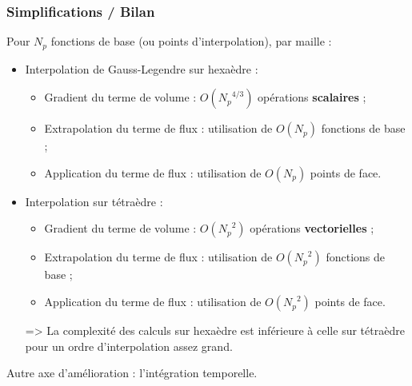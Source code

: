 \begin{frame}
\frametitle{Simplifications / Bilan}
\vfill
Pour $N_p$ fonctions de base (ou points d'interpolation), par maille :
\vfill
\begin{itemize}
\item Interpolation de Gauss-Legendre sur hexaèdre :
\begin{itemize}
\item Gradient du terme de volume : $O({N_p}^{4/3})$ opérations \textbf{scalaires} ;
\item Extrapolation du terme de flux : utilisation de $O(N_p)$ fonctions de base ;
\item Application du terme de flux : utilisation de $O(N_p)$ points de face.
\end{itemize}
\vfill
\item Interpolation sur tétraèdre :
\begin{itemize}
\item Gradient du terme de volume : $O({N_p}^{2})$ opérations \textbf{vectorielles} ;
\item Extrapolation du terme de flux : utilisation de $O({N_p}^{2})$ fonctions de base ;
\item Application du terme de flux : utilisation de $O({N_p}^{2})$ points de face.
\end{itemize}
\vfill
\item [=>] La complexité des calculs sur hexaèdre est inférieure à celle sur tétraèdre pour un ordre d'interpolation assez grand.
\end{itemize}
\vfill
Autre axe d'amélioration : l'intégration temporelle.
\vfill
\end{frame}

